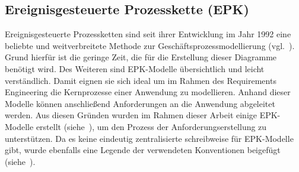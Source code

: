 
\subsection{Ereignisgesteuerte Prozesskette (EPK)}\label{subsec:epk)}
Ereignisgesteuerte Prozessketten sind seit ihrer Entwicklung im Jahr 1992 eine beliebte und weitverbreitete Methode zur 
Geschäftsprozessmodellierung (vgl.~\autocite{epc-diagram}).
Grund hierfür ist die geringe Zeit, die für die Erstellung dieser Diagramme benötigt wird.
Des Weiteren sind EPK-Modelle übersichtlich und leicht verständlich.
Damit eignen sie sich ideal um im Rahmen des Requirements Engineering die Kernprozesse einer Anwendung zu modellieren.
Anhand dieser Modelle können anschließend Anforderungen an die Anwendung abgeleitet werden.
Aus diesen Gründen wurden im Rahmen dieser Arbeit einige EPK-Modelle erstellt (siehe~), um den Prozess der Anforderungserstellung zu unterstützen.
Da es keine eindeutig zentralisierte schreibweise für EPK-Modelle gibt, wurde ebenfalls eine Legende der verwendeten Konventionen beigefügt (siehe~).
